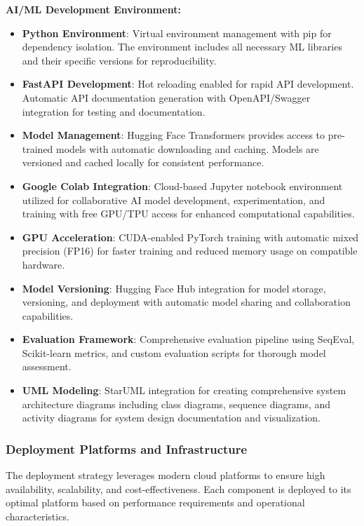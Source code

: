 \documentclass[12pt,a4paper]{article}
\begin{document}
\textbf{AI/ML Development Environment:}
\begin{itemize}
  \item \textbf{Python Environment}: Virtual environment management with pip for dependency isolation. The environment includes all necessary ML libraries and their specific versions for reproducibility.
  \item \textbf{FastAPI Development}: Hot reloading enabled for rapid API development. Automatic API documentation generation with OpenAPI/Swagger integration for testing and documentation.
  \item \textbf{Model Management}: Hugging Face Transformers provides access to pre-trained models with automatic downloading and caching. Models are versioned and cached locally for consistent performance.
  \item \textbf{Google Colab Integration}: Cloud-based Jupyter notebook environment utilized for collaborative AI model development, experimentation, and training with free GPU/TPU access for enhanced computational capabilities.
  \item \textbf{GPU Acceleration}: CUDA-enabled PyTorch training with automatic mixed precision (FP16) for faster training and reduced memory usage on compatible hardware.
  \item \textbf{Model Versioning}: Hugging Face Hub integration for model storage, versioning, and deployment with automatic model sharing and collaboration capabilities.
  \item \textbf{Evaluation Framework}: Comprehensive evaluation pipeline using SeqEval, Scikit-learn metrics, and custom evaluation scripts for thorough model assessment.
  \item \textbf{UML Modeling}: StarUML integration for creating comprehensive system architecture diagrams including class diagrams, sequence diagrams, and activity diagrams for system design documentation and visualization.
\end{itemize}

\subsubsection{Deployment Platforms and Infrastructure}

The deployment strategy leverages modern cloud platforms to ensure high availability, scalability, and cost-effectiveness. Each component is deployed to its optimal platform based on performance requirements and operational characteristics.
\end{document}
